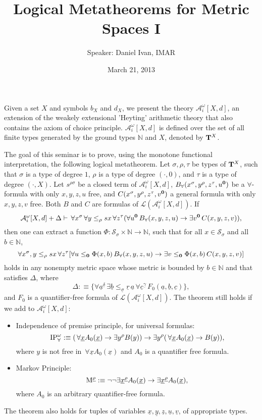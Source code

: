 \documentclass[a4paper,12pt]{article}
\title{Logical Metatheorems for Metric Spaces I}
\author{Speaker: Daniel Ivan, IMAR}
\date{March 21, 2013}
\newcommand{\AiwX}{\mathcal{A}_i^\omega[X,d]}
\def\N{{\mathbb N}}
\newcommand{\TX}{{\bf T}^X}
\newcommand{\sL}{\mathscr{L}}
\newcommand{\ul}{\underline}
\newcommand{\ra}{\rightarrow}
\newcommand{\Tw}{{\bf 0}}
\newcommand{\cL}{\mathcal{L}}
\newcommand{\cS}{\mathcal{S}}
\begin{document}
\maketitle
\thispagestyle{empty}

Given a set $X$ and symbols $b_X$ and $d_X$, we present the theory $\AiwX$, an extension of the weakely extensional 'Heyting' arithmetic theory that also contains the axiom of choice principle.
$\AiwX$ is defined over the set of all finite types generated by the ground types $\N$ and $X$, denoted by $\TX$.

The goal of this seminar is to prove, using the monotone functional interpretation, the following logical metatheorem.\newline
Let $\sigma, \rho, \tau$ be types of $\TX$, such that $\sigma$ is a type of degree $1$, $\rho$ is a type of degree $(\cdot, 0)$, and $\tau$ is a type of degree $(\cdot, X)$.
Let $s^{\rho \sigma}$ be a closed term of $\AiwX$, $B_\forall(x^\sigma, y^\rho, z^\tau, u^{\Tw} )$ be a $\forall$-formula with only $x, y, z, u$ free, and $C(x^\sigma, y^\rho, z^\tau, v^{\Tw} )$ a general formula with only $x, y, z, v$ free.
Both $B$ and $C$ are formulas of $\sL(\AiwX)$.
If 
\[
\AiwX + \Delta \vdash \,\forall x^\sigma \,\forall y\leq_\rho sx \,\forall z^\tau (\forall u^{\Tw}  \,B_\forall (x, y, z, u) \ra \exists v^{\Tw}  \, C(x, y, z, v)),
\]
then one can extract a function $\Phi: \cS_\sigma \times \N \ra \N$, such that for all $x\in \cS_\sigma$ and all $b\in \N$,
\[
\forall x^\sigma, y\leq_\rho sx \,\forall z^\tau [\forall u\leq_{\Tw}  \Phi(x,b) \,B_\forall (x, y, z, u) \ra \exists v \leq_{\Tw}  \Phi(x, b) \,C(x, y, z, v)]
\]
holds in any nonempty metric space whose metric is bounded by $b\in\N$ and that satisfies $\Delta$, where 
\[
 \Delta:\equiv \{\forall \ul{a}^{\ul{\delta}} \, \exists \ul{b} \leq_{\ul{\sigma}} \ul{r}\,\ul{a}\, \forall \ul{c}^{\ul{\gamma}}\, F_0(\ul{a}, \ul{b}, \ul{c})\},
\]
and $F_0$ is a quantifier-free formula of $\cL(\AiwX)$.
The theorem still holds if we add to $\AiwX$:
\begin{itemize}
 \item Independence of premise principle, for universal formulas:
\[
  {\rm IP}_\forall^\omega :\equiv (\,\forall \ul{x}A_0(\ul{x}) \ra \exists y^\rho B(y)) \ra \exists y^\rho(\,\forall \ul{x} A_0(\ul{x}) \ra B(y)),
\]
where $y$ is not free in $\,\forall \ul{x} A_0(\ul{x})$ and $A_0$ is a quantifier free formula.
\item Markov Principle:
\[
 {\rm M}^{\ul{\rho}} :\equiv \lnot \lnot \exists \ul{x}^{\ul{\rho}} A_0(\ul{x}) \ra \exists \ul{x}^{\ul{\rho}} A_0(\ul{x}),
\]
where $A_0$ is an arbitrary quantifier-free formula.
\end{itemize}
The theorem also holds for tuples of variables $\ul{x}, \ul{y}, \ul{z}, \ul{u}, \ul{v}$, of appropriate types.
\end{document}
